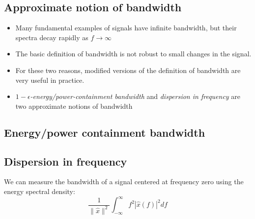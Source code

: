 \documentclass{ximera}
\begin{document}



\subsection{Approximate notion of bandwidth}
  \begin{itemize}
  \item Many fundamental examples of signals have infinite bandwidth, but their spectra decay rapidly as $f \to \infty$ 
  \item The basic definition of bandwidth is not robust to small changes in the signal.
  \item For these two reasons, modified versions of the definition of bandwidth are very useful in practice.
  \item \emph{$1-\epsilon$-energy/power-containment bandwidth} and \emph{dispersion in frequency} are two approximate notions of bandwidth
  \end{itemize}
  \vspace{3cm}


\subsection{Energy/power containment bandwidth}



\subsection{Dispersion in frequency}
We can measure the bandwidth of a signal centered at frequency zero using the energy spectral density:
  \[
    \frac{1}{\|\hat{x}\|^2} \int_{-\infty}^{\infty} f^2 |\hat{x}(f)|^2 df
  \]
\end{document}
